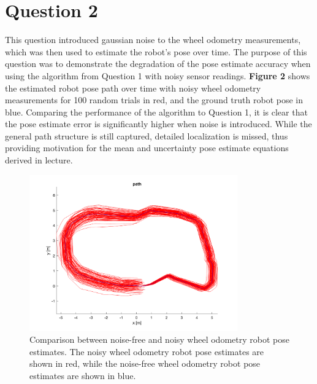 \documentclass{article}
\begin{document}
\section{Question 2}
This question introduced gaussian noise to the wheel odometry measurements, which was then used to estimate the robot's pose over time.
The purpose of this question was to demonstrate the degradation of the pose estimate accuracy when using the algorithm from Question 1 with noisy sensor readings.
\textbf{Figure 2} shows the estimated robot pose path over time with noisy wheel odometry measurements for 100 random trials in red, and the ground truth robot pose in blue.
Comparing the performance of the algorithm to Question 1, it is clear that the pose estimate error is significantly higher when noise is introduced. While the general path
structure is still captured, detailed localization is missed, thus providing motivation for the mean and uncertainty pose estimate equations derived
in lecture.

\begin{figure}[h!]
    \centering
    \includegraphics[width=0.8\textwidth]{ass1_q2.png}
    \caption{Comparison between noise-free and noisy wheel odometry robot pose estimates. The noisy wheel odometry robot pose estimates are shown in red, while the noise-free wheel odometry robot pose estimates are shown in blue.}
\end{figure}
\end{document}
